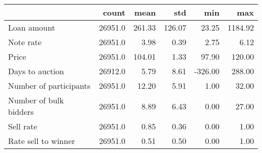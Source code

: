 \begin{tabular}{lrrrrr}
\toprule
{} &    count &    mean &     std &     min &      max \\
\midrule
Loan amount            &  26951.0 &  261.33 &  126.07 &   23.25 &  1184.92 \\
Note rate              &  26951.0 &    3.98 &    0.39 &    2.75 &     6.12 \\
Price                  &  26951.0 &  104.01 &    1.33 &   97.90 &   120.00 \\
Days to auction        &  26912.0 &    5.79 &    8.61 & -326.00 &   288.00 \\
Number of participants &  26951.0 &   12.20 &    5.91 &    1.00 &    32.00 \\
Number of bulk bidders &  26951.0 &    8.89 &    6.43 &    0.00 &    27.00 \\
Sell rate              &  26951.0 &    0.85 &    0.36 &    0.00 &     1.00 \\
Rate sell to winner    &  26951.0 &    0.51 &    0.50 &    0.00 &     1.00 \\
\bottomrule
\end{tabular}
